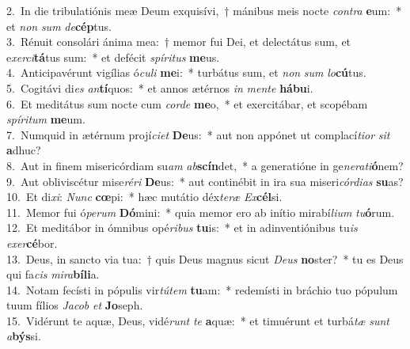 {2.~}In die tribulatiónis meæ Deum exquisívi,~† mánibus meis nocte \textit{con}\textit{tra} \textbf{e}um:~* et \textit{non} \textit{sum} \textit{de}\textbf{cép}tus.\\
{3.~}Rénuit consolári ánima mea:~† memor fui Dei, et delectátus sum, et e\textit{xer}\textit{ci}\textbf{tá}tus sum:~* et defécit \textit{spí}\textit{ri}\textit{tus} \textbf{me}us.\\
{4.~}Anticipavérunt vigílias ó\textit{cu}\textit{li} \textbf{me}i:~* turbátus sum, et \textit{non} \textit{sum} \textit{lo}\textbf{cú}tus.\\
{5.~}Cogitávi di\textit{es} \textit{an}\textbf{tí}quos:~* et annos ætérnos \textit{in} \textit{men}\textit{te} \textbf{há}\textbf{bu}i.\\
{6.~}Et meditátus sum nocte cum \textit{cor}\textit{de} \textbf{me}o,~* et exercitábar, et scopébam \textit{spí}\textit{ri}\textit{tum} \textbf{me}um.\\
{7.~}Numquid in ætérnum projí\textit{ci}\textit{et} \textbf{De}us:~* aut non appónet ut complací\textit{ti}\textit{or} \textit{sit} \textbf{a}dhuc?\\
{8.~}Aut in finem misericórdiam su\textit{am} \textit{ab}\textbf{scín}det,~* a generatióne in ge\textit{ne}\textit{ra}\textit{ti}\textbf{ó}nem?\\
{9.~}Aut obliviscétur mise\textit{ré}\textit{ri} \textbf{De}us:~* aut continébit in ira sua miseri\textit{cór}\textit{di}\textit{as} \textbf{su}as?\\
{10.~}Et di\textit{xi}: \textit{Nunc} \textbf{cœ}pi:~* hæc mutátio déx\textit{te}\textit{ræ} \textit{Ex}\textbf{cél}si.\\
{11.~}Memor fui ó\textit{pe}\textit{rum} \textbf{Dó}mini:~* quia memor ero ab inítio mirabí\textit{li}\textit{um} \textit{tu}\textbf{ó}rum.\\
{12.~}Et meditábor in ómnibus opé\textit{ri}\textit{bus} \textbf{tu}is:~* et in adinventiónibus tu\textit{is} \textit{e}\textit{xer}\textbf{cé}bor.\\
{13.~}Deus, in sancto via tua:~† quis Deus magnus sicut \textit{De}\textit{us} \textbf{no}ster?~* tu es Deus qui fa\textit{cis} \textit{mi}\textit{ra}\textbf{bí}\textbf{li}a.\\
{14.~}Notam fecísti in pópulis vir\textit{tú}\textit{tem} \textbf{tu}am:~* redemísti in bráchio tuo pópulum tuum fílios \textit{Ja}\textit{cob} \textit{et} \textbf{Jo}seph.\\
{15.~}Vidérunt te aquæ, Deus, vidé\textit{runt} \textit{te} \textbf{a}quæ:~* et timuérunt et turbá\textit{tæ} \textit{sunt} \textit{a}\textbf{býs}si.\\
